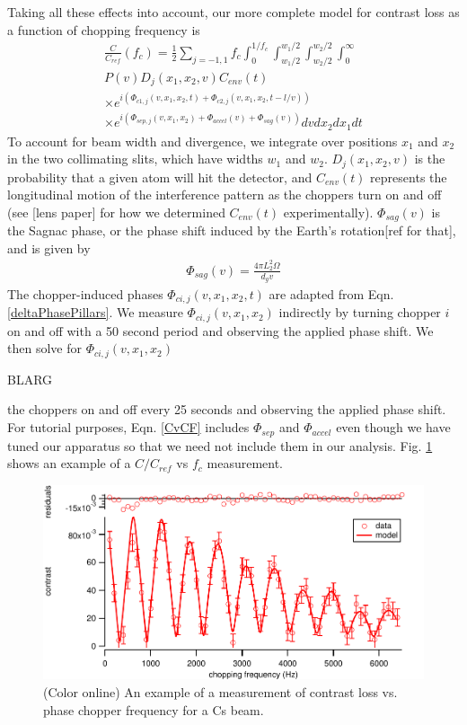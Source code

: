 \documentclass[twocolumn, prl,showpacs,superscriptaddress]{revtex4-1}   %
\newcommand{\figref}[1]{Fig. \ref{#1}}
\newcommand{\eqnref}[1]{Eqn. \ref{#1}}
\begin{document}
Taking all these effects into account, our more complete model for contrast loss as a function of chopping frequency is
\begin{align}
	\frac{C}{C_{ref}}(f_c) = 
		\frac{1}{2} \sum_{j=-1,1}
		f_c \int_0^{1/f_c} 
		\int_{w_1/2}^{w_1/2}
		\int_{w_2/2}^{w_2/2}
		\int_0^{\infty}           
		\nonumber \\
		P(v)
		D_j(x_1, x_2, v)
		C_{env}(t)                   
		\nonumber \\ \times
		e^{i( \Phi_{c1,j}(v,x_1,x_2,t) + \Phi_{c2,j}(v,x_1,x_2,t-l/v) )}
		\nonumber \\ \times
		e^{i( \Phi_{sep,j}(v,x_1,x_2) + \Phi_{accel}(v) + \Phi_{sag}(v) )}
		dv dx_{2} dx_{1} dt	
	\label{CvCF}
\end{align}
To account for beam width and divergence, we integrate over positions $x_1$ and $x_2$ in the two collimating slits, which have widths $w_1$ and $w_2$. $D_j(x_1, x_2, v)$ is the probability that a given atom will hit the detector, and $C_{env}(t)$ represents the longitudinal motion of the interference pattern as the choppers turn on and off (see [lens paper] for how we determined $C_{env}(t)$ experimentally). $\Phi_{sag}(v)$ is the Sagnac phase, or the phase shift induced by the Earth's rotation[ref for that], and is given by
\begin{align}
	\Phi_{sag}(v) = \frac{4\pi L_2^2\Omega}{d_g v}
	\label{phiSag}
\end{align}
The chopper-induced phases $\Phi_{ci,j}(v,x_1,x_2,t)$ are adapted from \eqnref{deltaPhasePillars}. 
We measure $\Phi_{ci,j}(v,x_1,x_2)$ indirectly by turning chopper $i$ on and off with a 50 second period and observing the applied phase shift. We then solve for $\Phi_{ci,j}(v,x_1,x_2)$




BLARG




the choppers on and off every 25 seconds and observing the applied phase shift. For tutorial purposes, \eqnref{CvCF} includes $\Phi_{sep}$ and $\Phi_{accel}$ even though we have tuned our apparatus so that we need not include them in our analysis. \figref{CvCFExample} shows an example of a $C/C_{ref}$ vs $f_c$ measurement.

\begin{figure}
\includegraphics[width=\linewidth,keepaspectratio]{CvCF_150420_o.pdf}
\caption{\label{CvCFExample}(Color online) An example of a measurement of contrast loss vs. phase chopper frequency for a Cs beam.}
\end{figure}
	
\end{document}
